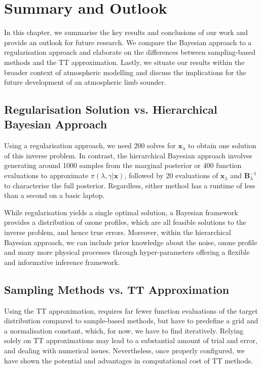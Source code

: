 \chapter{Summary and Outlook}
\label{ch:Concl}
In this chapter, we summarise the key results and conclusions of our work and provide an outlook for future research.
We compare the Bayesian approach to a regularisation approach and elaborate on the differences between sampling-based methods and the TT approximation.
Lastly, we situate our results within the broader context of atmospheric modelling and discuss the implications for the future development of an atmospheric limb sounder.



\section{Regularisation Solution vs. Hierarchical Bayesian Approach}
Using a regularisation approach, we need 200 solves for $\bm{x}_{\lambda}$ to obtain one solution of this inverse problem.
In contrast, the hierarchical Bayesian approach involves generating around 1000 samples from the marginal posterior or 400 function evaluations to approximate $\pi(\lambda, \gamma | \bm{x})$, followed by 20 evaluations of $\bm{x}_{\lambda}$ and $\bm{B}^{-1}_{\lambda}$ to characterise the full posterior.
Regardless, either method has a runtime of less than a second on a basic laptop.

While regularisation yields a single optimal solution, a Bayesian framework provides a distribution of ozone profiles, which are all feasible solutions to the inverse problem, and hence true errors.
Moreover, within the hierarchical Bayesian approach, we can include prior knowledge about the noise, ozone profile and many more physical processes through hyper-parameters offering a flexible and informative inference framework.


\section{Sampling Methods vs. TT Approximation}
Using the TT approximation, requires far fewer function evaluations of the target distribution compared to sample-based methods, but have to predefine a grid and a normalisation constant, which, for now, we have to find iteratively.
Relying solely on TT approximations may lead to a substantial amount of trial and error, and dealing with numerical issues.
Nevertheless, once properly configured, we have shown the potential and advantages in computational cost of TT methods.

